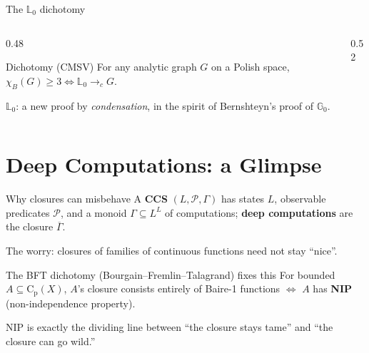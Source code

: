 \documentclass[aspectratio=169]{beamer}
\newcommand{\Cp}{\mathrm{C}_{\mathrm{p}}}
\begin{document}
\begin{frame}{The \texorpdfstring{$\mathbb L_0$}{L0} dichotomy}
  \begin{columns}[T]
    \begin{column}{0.48\textwidth}
      \begin{block}{Dichotomy (CMSV)}
        For any analytic graph $G$ on a Polish space, $\chi_B(G)\geq 3 \iff \mathbb L_0\to_c G$.
      \end{block}
      $\mathbb L_0$: a \alert{new} proof by \emph{condensation}, in the spirit of Bernshteyn's proof of $\mathbb G_0$.
    \end{column}
    \begin{column}{0.52\textwidth}
      \centering
      \resizebox{!}{4.5cm}{}
    \end{column}
  \end{columns}
\end{frame}

\section{Deep Computations: a Glimpse}

\begin{frame}{Why closures can misbehave}
  A \textbf{CCS} $(L,\mathcal P,\Gamma)$ has states $L$, observable predicates $\mathcal P$, and a monoid $\Gamma\subseteq L^L$ of computations; \textbf{deep computations} are the closure $\overline\Gamma$.
  \vspace{0.3em}

  The worry: closures of families of continuous functions need \alert{not} stay ``nice''.
  \vspace{0.3em}

  \begin{block}{The BFT dichotomy (Bourgain--Fremlin--Talagrand) fixes this}
    For bounded $A\subseteq \Cp(X)$, $A$'s closure consists entirely of \alert{Baire-1 functions} $\iff$ $A$ has \textbf{NIP} (non-independence property).
  \end{block}
  NIP is exactly the dividing line between ``the closure stays tame'' and ``the closure can go wild.''
\end{frame}
\end{document}
